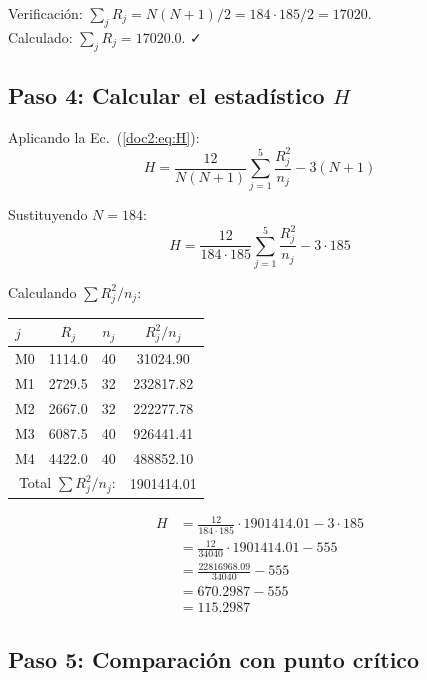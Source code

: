 \documentclass[12pt,a4paper,oneside]{book}
\begin{document}
Verificación: $\sum_j R_j = N(N+1)/2 = 184\cdot185/2 = 17020$. \\
Calculado: $\sum_j R_j = 17020.0$. ✓

\subsection{Paso 4: Calcular el estadístico $H$}

Aplicando la Ec.~(\ref{doc2:eq:H}):
\begin{equation}
H = \frac{12}{N(N+1)}\sum_{j=1}^{5}\frac{R_j^2}{n_j} - 3(N+1)
\end{equation}

Sustituyendo $N=184$:
\begin{equation}
H = \frac{12}{184\cdot185}\sum_{j=1}^{5}\frac{R_j^2}{n_j} - 3\cdot185
\end{equation}

Calculando $\sum R_j^2/n_j$:

\begin{table}[H]
\centering
\begin{tabular}{lccc}
\toprule
$j$ & $R_j$ & $n_j$ & $R_j^2/n_j$ \\
\midrule
M0 & 1114.0 & 40 & 31024.90 \\
M1 & 2729.5 & 32 & 232817.82 \\
M2 & 2667.0 & 32 & 222277.78 \\
M3 & 6087.5 & 40 & 926441.41 \\
M4 & 4422.0 & 40 & 488852.10 \\
\midrule
\multicolumn{3}{r}{Total $\sum R_j^2/n_j$:} & 1901414.01 \\
\bottomrule
\end{tabular}
\end{table}

\begin{align}
H &= \frac{12}{184\cdot185}\cdot1901414.01 - 3\cdot185 \\
  &= \frac{12}{34040}\cdot1901414.01 - 555 \\
  &= \frac{22816968.09}{34040} - 555 \\
  &= 670.2987 - 555 \\
  &= \boxed{115.2987}
\end{align}

\subsection{Paso 5: Comparación con punto crítico}
\end{document}

